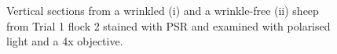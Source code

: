 %

\begin{figure}[p]
\centering
  \caption{Vertical sections from a wrinkled (i) and a wrinkle-free (ii)  sheep from Trial 1 flock 2 stained with PSR and examined with polarised light and a 4x objective. }
\vfill
  \label{fig:polar}
\end{figure}

%

